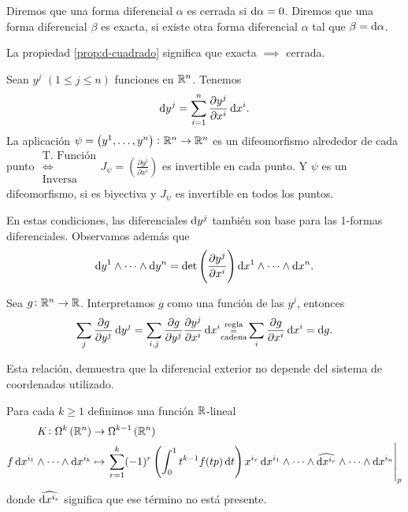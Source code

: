 \begin{defi}
    Diremos que una forma diferencial $\alpha$ es cerrada si $\dif \alpha =0$. Diremos que una forma diferencial $\beta$ es exacta, si existe otra
    forma diferencial $\alpha$ tal que $\beta = \dif \alpha$.
\end{defi}

\begin{obs}
    La propiedad \ref{prop:d-cuadrado} significa que exacta $\implies$ cerrada.
\end{obs}

\begin{prop}
    Sean $y^j$ $(1 \leq j \leq n)$ funciones en $\mathbb{R}^n$. Tenemos
    \[
        \dif y^j = \sum^n_{i=1} \frac{\partial y^j}{\partial x^i} \dif x^i.
    \]
    La aplicación $\psi = \left( y^1, \dots, y^n \right) \colon \mathbb{R}^n \to \mathbb{R}^n$ es un difeomorfismo alrededor de cada punto
    $\substack{\text{T. Función} \\ \iff \\ \text{Inversa}} J_\psi = \left( \frac{\partial y^j}{\partial x^i} \right)$ es invertible en cada punto.
    Y $\psi$ es un difeomorfismo, si es biyectiva y $J_\psi$ es invertible en todos los puntos.

    En estas condiciones, las diferenciales $\dif y^j$ tambi\'en son base para las 1-formas diferenciales. Observamos además que
    \[
        \dif y^1 \wedge \cdots \wedge \dif y^n = \det \left( \frac{\partial y^j}{\partial x^i} \right) \dif x^1 \wedge \cdots \wedge \dif x^n.
    \]
\end{prop}

\begin{obs}
    Sea $g \colon \mathbb{R}^n \to \mathbb{R}$. Interpretamos $g$ como una función de las $y^j$, entonces
    \[
        \sum_j \frac{\partial g}{\partial y^j} \dif y^j = \sum_{i, j} \frac{\partial g}{\partial y^j} \frac{\partial y^j}{\partial x^i} \dif x^i
        \substack{\text{regla} \\ = \\ \text{cadena}} \sum_i \frac{\partial g}{\partial x^i} \dif x^i = \dif g.
    \]

    Esta relación, demuestra que la diferencial exterior no depende del sistema de coordenadas utilizado.
\end{obs}

\begin{defi}
    Para cada $k \geq 1$ definimos una función $\mathbb{R}$-lineal
    \[
        \begin{aligned}
            K \colon \Omega^k\left( \real^n \right) &\to \Omega^{k-1}\left( \real^n \right) \\
            f \dif x^{i_1} \wedge \cdots \wedge \dif x^{i_k} &\mapsto \left. \sum^k_{r=1} (-1)^r \left( \int^1_0 t^{k-1} f(tp) \dif t\right) x^{i_r}
            \dif x^{i_1} \wedge \cdots \wedge \widehat{\dif x^{i_r}} \wedge \cdots \wedge \dif x^{i_n} \right\vert_p
        \end{aligned}
    \]
    donde $\widehat{\dif x^{i_r}}$ significa que ese t\'ermino no está presente.
\end{defi}

